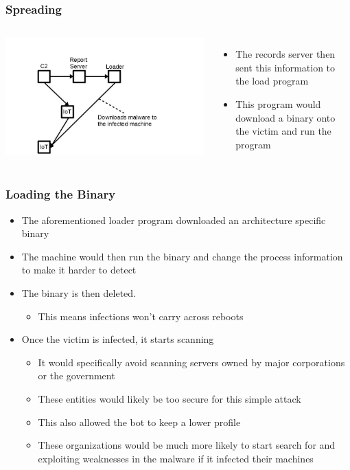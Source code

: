\documentclass{beamer}
\begin{document}
\begin{frame}
	\frametitle{Spreading}
	\begin{columns}
			\includegraphics[width=\textwidth]{fig3.jpg}
			\begin{itemize}
				\item The records server then sent this information to the load program
				\item This program would download a binary onto the victim and run the program
			\end{itemize}
	\end{columns}
\end{frame}

\begin{frame}
	\frametitle{Loading the Binary}
	\begin{itemize}
		\item The aforementioned loader program downloaded an architecture specific binary
		\item The machine would then run the binary and change the process information to make it harder to detect
		\item The binary is then deleted.
		\begin{itemize}
			\item This means infections won't carry across reboots
		\end{itemize}
		\item Once the victim is infected, it starts scanning
		\begin{itemize}
			\item It would specifically avoid scanning servers owned by major corporations or the government
			\item These entities would likely be too secure for this simple attack
			\item This also allowed the bot to keep a lower profile
			\item These organizations would be much more likely to start search for and exploiting weaknesses in the malware if it infected their machines
		\end{itemize}
	\end{itemize}
\end{frame}
\end{document}
